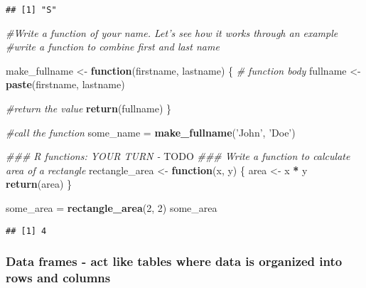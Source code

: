 \documentclass[
]{article}
\newenvironment{Shaded}{\begin{snugshade}}{\end{snugshade}}
\newcommand{\AlertTok}[1]{\textcolor[rgb]{0.94,0.16,0.16}{#1}}
\newcommand{\CommentTok}[1]{\textcolor[rgb]{0.56,0.35,0.01}{\textit{#1}}}
\newcommand{\ControlFlowTok}[1]{\textcolor[rgb]{0.13,0.29,0.53}{\textbf{#1}}}
\newcommand{\DecValTok}[1]{\textcolor[rgb]{0.00,0.00,0.81}{#1}}
\newcommand{\KeywordTok}[1]{\textcolor[rgb]{0.13,0.29,0.53}{\textbf{#1}}}
\newcommand{\NormalTok}[1]{#1}
\newcommand{\OperatorTok}[1]{\textcolor[rgb]{0.81,0.36,0.00}{\textbf{#1}}}
\newcommand{\StringTok}[1]{\textcolor[rgb]{0.31,0.60,0.02}{#1}}
\begin{document}
\begin{verbatim}
## [1] "S"
\end{verbatim}

\begin{Shaded}
\begin{Highlighting}[]
\CommentTok{#Write a function of your name. Let's see how it works through an example}
\CommentTok{#write a function to combine first and last name}

\NormalTok{make_fullname <-}\StringTok{ }\ControlFlowTok{function}\NormalTok{(firstname, lastname) \{}
  \CommentTok{# function body}
\NormalTok{  fullname <-}\StringTok{ }\KeywordTok{paste}\NormalTok{(firstname, lastname)}
  
  \CommentTok{#return the value}
  \KeywordTok{return}\NormalTok{(fullname)}
\NormalTok{\}}

\CommentTok{#call the function}
\NormalTok{some_name =}\StringTok{ }\KeywordTok{make_fullname}\NormalTok{(}\StringTok{'John'}\NormalTok{, }\StringTok{'Doe'}\NormalTok{)}

\CommentTok{### R functions: YOUR TURN - }\AlertTok{TODO}
\CommentTok{### Write a function to calculate area of a rectangle}
\NormalTok{rectangle_area <-}\StringTok{ }\ControlFlowTok{function}\NormalTok{(x, y) \{}
\NormalTok{area <-}\StringTok{ }\NormalTok{x }\OperatorTok{*}\StringTok{ }\NormalTok{y}
\KeywordTok{return}\NormalTok{(area)}
\NormalTok{\}}

\NormalTok{some_area =}\StringTok{ }\KeywordTok{rectangle_area}\NormalTok{(}\DecValTok{2}\NormalTok{, }\DecValTok{2}\NormalTok{)}
\NormalTok{some_area}
\end{Highlighting}
\end{Shaded}

\begin{verbatim}
## [1] 4
\end{verbatim}

\hypertarget{data-frames---act-like-tables-where-data-is-organized-into-rows-and-columns}{%
\subsubsection{Data frames - act like tables where data is organized
into rows and
columns}\label{data-frames---act-like-tables-where-data-is-organized-into-rows-and-columns}}
\end{document}
